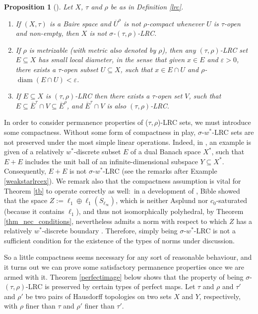 \documentclass[12pt,reqno]{amsart}
\newcommand{\cl}[1]{\ensuremath{\overline{{#1}}}}
\newcommand{\diam}[1]{\ensuremath{\sdiam{\left({#1}\right)}}}
\newcommand{\ep}{\varepsilon}
\DeclareMathOperator{\sdiam}{diam}
\newtheorem{prop}[thm]{Proposition}
\theoremstyle{definition}
\begin{document}
\begin{prop}[{\cite[Proposition 12]{fpst:14}}]\label{prop_lrc_facts}
Let $X$, $\tau$ and $\rho$ be as in Definition \ref{lrc}.
\begin{enumerate}
\item If $(X,\tau)$ is a Baire space and $\cl{U}^\rho$ is not $\rho$-compact whenever $U$ is $\tau$-open and non-empty, then $X$ is not $\sigma$-$(\tau,\rho)$-LRC.
\item If $\rho$ is metrizable (with metric also denoted by $\rho$), then any $(\tau,\rho)$-LRC set $E\subseteq X$ has small local diameter, in the sense that given $x \in E$ and $\ep>0$, there exists a $\tau$-open subset $U \subseteq X$, such that $x \in E \cap U$ and $\rho$-$\diam{E \cap U} < \ep$.
\item If $E\subseteq X$ is $(\tau,\rho)$-LRC then there exists a $\tau$-open set $V$, such that $E \subseteq \cl{E}^\tau \cap V \subseteq \cl{E}^\rho$, and $\cl{E}^\tau \cap V$ is also $(\tau,\rho)$-LRC.
\end{enumerate}
\end{prop}

In order to consider permanence properties of ($\tau,\rho$)-LRC sets, we must introduce some compactness. Without some form of compactness in play, $\sigma$-$w^*$-LRC sets are not preserved under the most simple linear operations. Indeed, in \cite[Remark 1.10 (3)]{bible:14}, an example is given of a relatively $w^*$-discrete subset $E$ of a dual Banach space $X^*$, such that $E+E$ includes the unit ball of an infinite-dimensional subspace $Y \subseteq X^*$. Consequently, $E+E$ is not $\sigma$-$w^*$-LRC (see the remarks after Example \ref{weakstarlrcex}). We remark also that the compactness assumption is vital for Theorem \ref{tb} to operate correctly as well:~in a development of \cite[Remark 1.10 (3)]{bible:14}, Bible showed that the space $Z:=\ell_1 \oplus \ell_1(S_{\ell_\infty})$, which is neither Asplund nor $c_0$-saturated (because it contains $\ell_1$), and thus not isomorphically polyhedral, by Theorem \ref{thm_nec_conditions}, nevertheless admits a norm with respect to which $Z$ has a relatively $w^*$-discrete boundary \cite[Remark 3.4.4]{bible:16}. Therefore, simply being $\sigma$-$w^*$-LRC is not a sufficient condition for the existence of the types of norms under discussion.

So a little compactness seems necessary for any sort of reasonable behaviour, and it turns out we can prove some satisfactory permanence properties once we are armed with it. Theorem \ref{perfectimage} below shows that the property of being $\sigma$-$(\tau,\rho)$-LRC is preserved by certain types of perfect maps. Let $\tau$ and $\rho$ and $\tau'$ and $\rho'$ be two pairs of Hausdorff topologies on two sets $X$ and $Y$, respectively, with $\rho$ finer than $\tau$ and $\rho'$ finer than $\tau'$.
\end{document}
